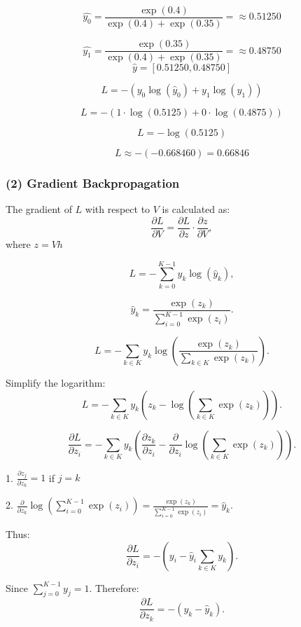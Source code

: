 \documentclass[12pt]{article}
\begin{document}
\[
\hat{y_0} = \frac{\exp(0.4)}{\exp(0.4) + \exp(0.35)} =  \approx 0.51250
\]

\[
\hat{y_1} =\frac{\exp(0.35)}{\exp(0.4) + \exp(0.35)} =  \approx 0.48750
\]
\[
\hat{y} = [0.51250, 0.48750]
\]

\[
L = -\left(y_0 \log(\hat{y}_0) + y_1 \log(\hat{y}_1)\right)
\]

\[
L = -\left(1 \cdot \log(0.5125) + 0 \cdot \log(0.4875)\right)
\]




\[
L = -\log(0.5125)
\]

\[
L \approx -(-0.668460) = 0.66846
\]





\newpage
\subsubsection*{(2) Gradient Backpropagation}






The gradient of \( L \) with respect to \( V \) is calculated as:
\[
\frac{\partial L}{\partial V} = \frac{\partial L}{\partial z} \cdot \frac{\partial z}{\partial V},
\]
where \( z = Vh \) 


\[
L = -\sum_{k=0}^{K-1} y_k \log(\hat{y}_k),
\]

\[
\hat{y}_k = \frac{\exp(z_k)}{\sum_{i=0}^{K-1} \exp(z_i)}.
\]

\[
L = -\sum_{k\in K} y_k \log\left(\frac{\exp(z_k)}{\sum_{k\in K }^{} \exp(z_k)}\right).
\]

Simplify the logarithm:
\[
L = -\sum_{k\in K}^{} y_k \left(z_k - \log\left(\sum_{k\in K}^{} \exp(z_k)\right)\right).
\]


\[
\frac{\partial L}{\partial z_i} = -\sum_{k\in K}^{} y_k \left(\frac{\partial z_k}{\partial z_i} - \frac{\partial}{\partial z_i} \log\left(\sum_{k\in K}^{} \exp(z_k)\right)\right).
\]

1. \(\frac{\partial z_j}{\partial z_k} = 1\) if \( j = k \)


2. \(\frac{\partial}{\partial z_k} \log\left(\sum_{i=0}^{K-1} \exp(z_i)\right) = \frac{\exp(z_k)}{\sum_{i=0}^{K-1} \exp(z_i)} = \hat{y}_k\).

\vspace{1cm}
Thus:
\[
\frac{\partial L}{\partial z_i} = -\left(y_i - \hat{y}_i \sum_{k \in K}^{} y_k\right).
\]

Since \(\sum_{j=0}^{K-1} y_j = 1\). Therefore:
\[
\frac{\partial L}{\partial z_k} = -(y_k - \hat{y}_k).
\]
\end{document}
